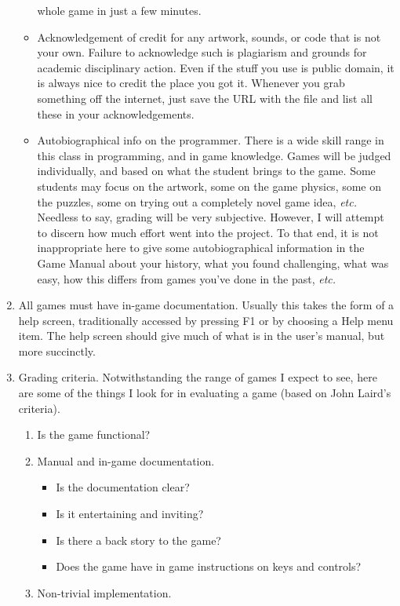 \documentclass{article}
\begin{document}
\begin{enumerate}
\begin{itemize}
  whole game in just a few minutes.
\item Acknowledgement of credit for any artwork, sounds, or code that
  is not your own. Failure to acknowledge such is plagiarism and
  grounds for academic disciplinary action. Even if the stuff you use
  is public domain, it is always nice to credit the place you got
  it. Whenever you grab something off the internet, just save the URL
  with the file and list all these in your acknowledgements.
\item Autobiographical info on the programmer. There is a wide skill
  range in this class in programming, and in game knowledge. Games
  will be judged individually, and based on what the student brings to
  the game. Some students may focus on the artwork, some on the game
  physics, some on the puzzles, some on trying out a completely novel
  game idea, {\em etc.} Needless to say, grading will be very
  subjective. However, I will attempt to discern how much effort went
  into the project.  To that end, it is not inappropriate here to give
  some autobiographical information in the Game Manual about your
  history, what you found challenging, what was easy, how this differs
  from games you’ve done in the past, {\em etc.}
\end{itemize}
\item All games must have in-game documentation. Usually this takes
  the form of a help screen, traditionally accessed by pressing F1 or
  by choosing a Help menu item. The help screen should give much of
  what is in the user’s manual, but more succinctly.
\item Grading criteria. Notwithstanding the range of games I expect to
  see, here are some of the things I look for in evaluating a game
  (based on John Laird’s criteria).
\begin{multicols}{2}
\begin{enumerate}
\item Is the game functional?
\item Manual and in-game documentation.
\begin{itemize}
\item Is the documentation clear?
\item Is it entertaining and inviting?
\item Is there a back story to the game?
\item Does the game have in game instructions
on keys and controls?
\end{itemize}
\item Non-trivial implementation.  

\end{enumerate}
\end{multicols}
\end{enumerate}
\end{document}
